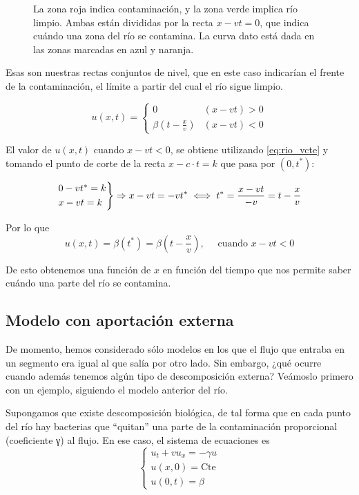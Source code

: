 		\begin{figure}[hbtp]
			\centering
			\caption{La zona roja indica contaminación, y la zona verde implica río limpio. Ambas están divididas por la recta $x - vt = 0$, que indica cuándo una zona del río se contamina. La curva dato está dada en las zonas marcadas en azul y naranja.}
			\label{fig:ContaminacionRio}
		\end{figure}

		Esas son nuestras rectas conjuntos de nivel, que en este caso indicarían el frente de la contaminación, el límite a partir del cual el río sigue limpio.

		$$u(x,t) =
			\begin{cases}
				0                      & (x-vt) > 0 \\
				\beta(t - \frac{x}{v}) & (x-vt) < 0
			\end{cases}
		$$

		El valor de $u(x,t)$ cuando $x-vt < 0$, se obtiene utilizando \ref{eq:rio_vcte} y tomando el punto de corte de la recta $x-c \cdot t=k$ que pasa por $(0,t^*)$:

		$$
		\begin{rcases}
			0 - vt^{*} = k \\
			x - vt = k
		\end{rcases}
		 \Rightarrow x-vt = -vt^{*} \iff t^* = \frac{x-vt}{-v} = t - \frac{x}{v}$$

		Por lo que
		$$u(x,t) = \beta(t^*) = \beta(t - \frac{x}{v}), \quad \text{ cuando } x - vt < 0$$

		De esto obtenemos una función de $x$ en función del tiempo que nos permite saber cuándo una parte del río se contamina.

	\subsection{Modelo con aportación externa}

	De momento, hemos considerado sólo modelos en los que el flujo que entraba en un segmento era igual al que salía por otro lado. Sin embargo, ¿qué ocurre cuando además tenemos algún tipo de descomposición externa? Veámoslo primero con un ejemplo, siguiendo el modelo anterior del río.

		Supongamos que existe descomposición biológica, de tal forma que en cada punto del río hay bacterias que ``quitan'' una parte de la contaminación proporcional (coeficiente γ) al flujo. En ese caso, el sistema de ecuaciones es \[
		\begin{cases}
		u_t + vu_x = -\gamma u \\
		u(x,0) = \text{Cte} \\
		u(0,t) = \beta
		\end{cases} \]

